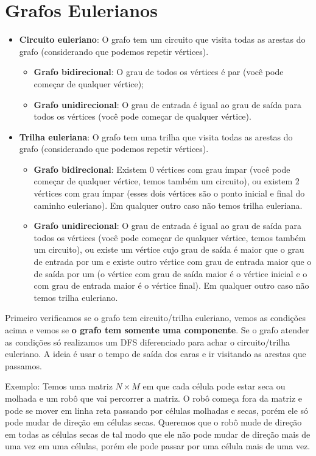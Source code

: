 
    \section{Grafos Eulerianos}

    \begin{itemize}
        \item \textbf{Circuito euleriano}: O grafo tem um circuito que visita todas as arestas do grafo (considerando que podemos repetir vértices).
        \begin{itemize}
            \item \textbf{Grafo bidirecional}: O grau de todos os vértices é par (você pode começar de qualquer vértice);
            \item \textbf{Grafo unidirecional}: O grau de entrada é igual ao grau de saída para todos os vértices (você pode começar de qualquer vértice).
        \end{itemize}
        \item \textbf{Trilha euleriana}: O grafo tem uma trilha que visita todas as arestas do grafo (considerando que podemos repetir vértices).
        \begin{itemize}
            \item \textbf{Grafo bidirecional}: Existem $0$ vértices com grau ímpar (você pode começar de qualquer vértice, temos também um circuito), ou existem $2$ vértices com grau ímpar (esses dois vértices são o ponto inicial e final do caminho euleriano). Em qualquer outro caso não temos trilha euleriana.
            \item \textbf{Grafo unidirecional}: O grau de entrada é igual ao grau de saída para todos os vértices (você pode começar de qualquer vértice, temos também um circuito), ou existe um vértice cujo grau de saída é maior que o grau de entrada por um e existe outro vértice com grau de entrada maior que o de saída por um (o vértice com grau de saída maior é o vértice inicial e o com grau de entrada maior é o vértice final). Em qualquer outro caso não temos trilha euleriano.
        \end{itemize}
    \end{itemize}

    Primeiro verificamos se o grafo tem circuito/trilha euleriano, vemos as condições acima e vemos se \textbf{o grafo tem somente uma componente}. Se o grafo atender as condições só realizamos um DFS diferenciado para achar o circuito/trilha euleriano. A ideia é usar o tempo de saída dos caras e ir visitando as arestas que passamos.

    Exemplo: Temos uma matriz $N\times M$ em que cada célula pode estar seca ou molhada e um robô que vai percorrer a matriz. O robô começa fora da matriz e pode se mover em linha reta passando por células molhadas e secas, porém ele só pode mudar de direção em células secas. Queremos que o robô mude de direção em todas as células secas de tal modo que ele não pode mudar de direção mais de uma vez em uma células, porém ele pode passar por uma célula mais de uma vez.

